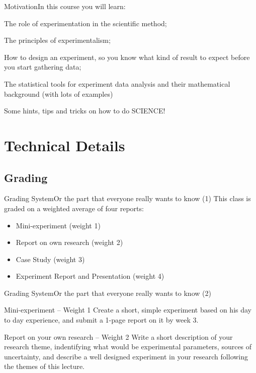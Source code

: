 \documentclass[t]{beamer}
\begin{document}
\begin{ftst}
  {Motivation}{In this course you will learn:}

\vfill
  
  \bitems The role of experimentation in the scientific method;

\vone
  
\item The principles of experimentalism;

  \vone
  
\item How to design an experiment, so you know what kind of result to
  expect before you start gathering data;

  \vone

  
\item The statistical tools for experiment data analysis and their
  mathematical background (with lots of examples)

  \vone
  
\item Some hints, tips and tricks on how to do SCIENCE!\eitem
\end{ftst}


\section{Technical Details}
\subsection{Grading}

\begin{ftst}
  {Grading System}{Or the part that everyone really wants to know (1)}
  This class is graded on a weighted average of four reports:

  \vone
  
  \begin{itemize}
  \item Mini-experiment (weight 1)
  \item Report on own research (weight 2)
  \item Case Study (weight 3)
  \item Experiment Report and Presentation (weight 4)
  \end{itemize}
\end{ftst}

\begin{ftst}
  {Grading System}{Or the part that everyone really wants to know (2)}
  \begin{block}{Mini-experiment -- Weight 1}
    Create a short, simple experiment based on his day to day
    experience, and submit a 1-page report on it by week 3.
  \end{block}
  \begin{block}{Report on your own research -- Weight 2}
    Write a short description of your research theme, indentifying
    what would be experimental parameters, sources of uncertainty, and
    describe a well designed experiment in your research following the
    themes of this lecture.
  \end{block}
\end{ftst}
\end{document}

